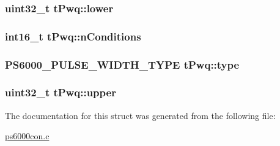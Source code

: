 \subsubsection[{\texorpdfstring{lower}{lower}}]{\setlength{\rightskip}{0pt plus 5cm}uint32\+\_\+t t\+Pwq\+::lower}\hypertarget{structtPwq_a19cdd72b9c92662990407e63f09d99d0}{}\label{structtPwq_a19cdd72b9c92662990407e63f09d99d0}
\subsubsection[{\texorpdfstring{n\+Conditions}{nConditions}}]{\setlength{\rightskip}{0pt plus 5cm}int16\+\_\+t t\+Pwq\+::n\+Conditions}\hypertarget{structtPwq_a1504dd915be3fa91682d5f1aaac5cfac}{}\label{structtPwq_a1504dd915be3fa91682d5f1aaac5cfac}
\subsubsection[{\texorpdfstring{type}{type}}]{\setlength{\rightskip}{0pt plus 5cm}P\+S6000\+\_\+\+P\+U\+L\+S\+E\+\_\+\+W\+I\+D\+T\+H\+\_\+\+T\+Y\+PE t\+Pwq\+::type}\hypertarget{structtPwq_aad2ba1d7b686ae62cae5759c18419762}{}\label{structtPwq_aad2ba1d7b686ae62cae5759c18419762}
\subsubsection[{\texorpdfstring{upper}{upper}}]{\setlength{\rightskip}{0pt plus 5cm}uint32\+\_\+t t\+Pwq\+::upper}\hypertarget{structtPwq_ac488b82554fc26e25125cbcb73046eac}{}\label{structtPwq_ac488b82554fc26e25125cbcb73046eac}


The documentation for this struct was generated from the following file\+:\begin{DoxyCompactItemize}
\item 
\hyperlink{ps6000con_8c}{ps6000con.\+c}\end{DoxyCompactItemize}
